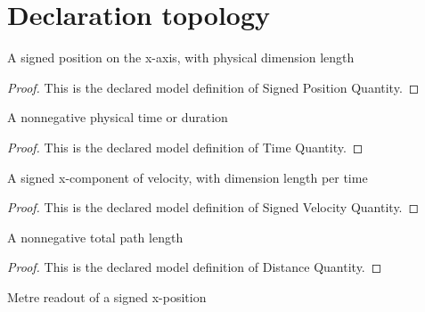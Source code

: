 \section{Declaration topology}
\begin{definition}
  \label{def:physics:phyx-mini-0672:phyxminiproblems-problemphyxmini0672-signedpositionquantity}
  A signed position on the x-axis, with physical dimension length
\end{definition}
\begin{proof}
  This is the declared model definition of Signed Position Quantity.
\end{proof}
\begin{definition}
  \label{def:physics:phyx-mini-0672:phyxminiproblems-problemphyxmini0672-timequantity}
  A nonnegative physical time or duration
\end{definition}
\begin{proof}
  This is the declared model definition of Time Quantity.
\end{proof}
\begin{definition}
  \label{def:physics:phyx-mini-0672:phyxminiproblems-problemphyxmini0672-signedvelocityquantity}
  A signed x-component of velocity, with dimension length per time
\end{definition}
\begin{proof}
  This is the declared model definition of Signed Velocity Quantity.
\end{proof}
\begin{definition}
  \label{def:physics:phyx-mini-0672:phyxminiproblems-problemphyxmini0672-distancequantity}
  A nonnegative total path length
\end{definition}
\begin{proof}
  This is the declared model definition of Distance Quantity.
\end{proof}
\begin{definition}
  \label{def:physics:phyx-mini-0672:phyxminiproblems-problemphyxmini0672-positioninmeters}
  Metre readout of a signed x-position
\end{definition}
